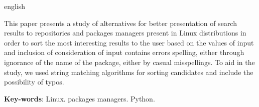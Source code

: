 \begin{resumo}[Abstract]
 \begin{otherlanguage*}{english}
   
   This paper presents a study of alternatives for better presentation of search results to repositories and packages managers present in Linux distributions in order to sort the most interesting results to the user based on the values of input and inclusion of consideration of input contains errors spelling, either through ignorance of the name of the package, either by casual misspellings. To aid in the study, we used string matching algorithms for sorting candidates and include the possibility of typos.

   \vspace{\onelineskip}
 
   \noindent 
   \textbf{Key-words}: Linux. packages managers. Python.
 \end{otherlanguage*}
\end{resumo}
